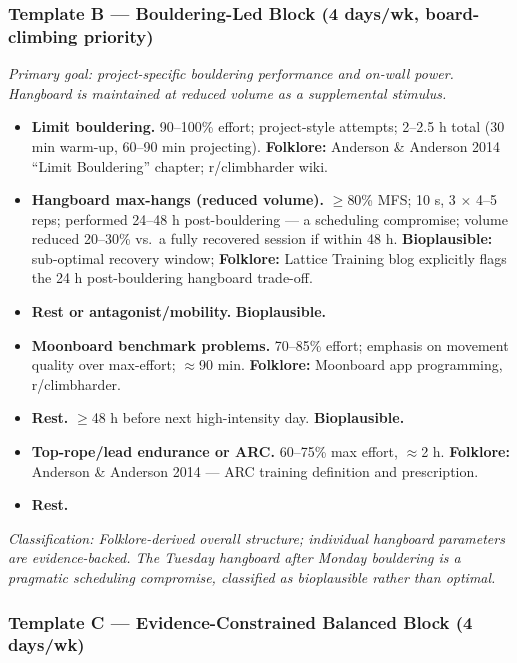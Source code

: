 \subsubsection*{Template B — Bouldering-Led Block (4 days/wk, board-climbing priority)}

\noindent\textit{Primary goal: project-specific bouldering performance and on-wall power. Hangboard is maintained at reduced volume as a supplemental stimulus.}

\begin{itemize}[leftmargin=1.6cm,labelwidth=1.2cm,align=left]
  \item[\textbf{Mon:}] \textbf{Limit bouldering.} 90–100\% effort; project-style attempts; 2–2.5 h total (30 min warm-up, 60–90 min projecting). \textbf{Folklore:} Anderson \& Anderson 2014 ``Limit Bouldering'' chapter; r/climbharder wiki.
  \item[\textbf{Tue:}] \textbf{Hangboard max-hangs (reduced volume).} $\geq$80\% MFS; 10 s, 3 $\times$ 4–5 reps; performed 24–48 h post-bouldering — a scheduling compromise; volume reduced 20–30\% vs.\ a fully recovered session if within 48 h. \textbf{Bioplausible:} sub-optimal recovery window; \textbf{Folklore:} Lattice Training blog explicitly flags the 24 h post-bouldering hangboard trade-off.
  \item[\textbf{Wed:}] \textbf{Rest or antagonist/mobility.} \textbf{Bioplausible.}
  \item[\textbf{Thu:}] \textbf{Moonboard benchmark problems.} 70–85\% effort; emphasis on movement quality over max-effort; $\approx$90 min. \textbf{Folklore:} Moonboard app programming, r/climbharder.
  \item[\textbf{Fri:}] \textbf{Rest.} $\geq$48 h before next high-intensity day. \textbf{Bioplausible.}
  \item[\textbf{Sat:}] \textbf{Top-rope/lead endurance or ARC.} 60–75\% max effort, $\approx$2 h. \textbf{Folklore:} Anderson \& Anderson 2014 — ARC training definition and prescription.
  \item[\textbf{Sun:}] \textbf{Rest.}
\end{itemize}

\noindent\textit{Classification: Folklore-derived overall structure; individual hangboard parameters are evidence-backed. The Tuesday hangboard after Monday bouldering is a pragmatic scheduling compromise, classified as bioplausible rather than optimal.}

\subsubsection*{Template C — Evidence-Constrained Balanced Block (4 days/wk)}

